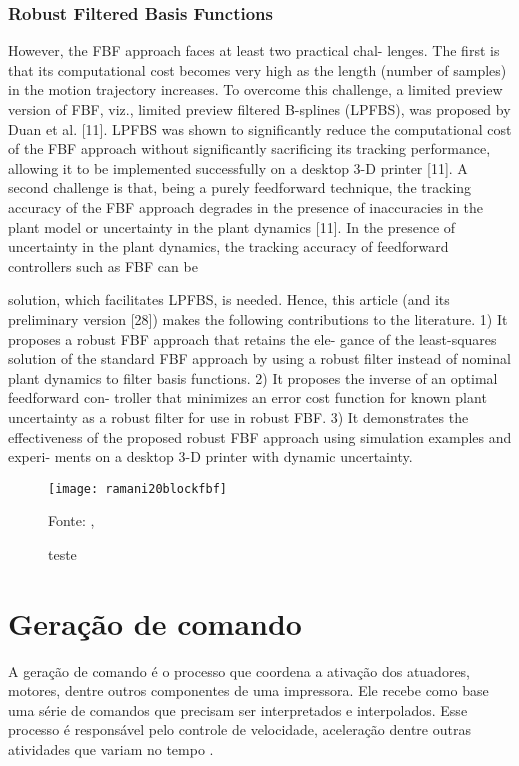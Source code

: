 \subsubsection{Robust Filtered Basis Functions}

However, the FBF approach faces at least two practical chal-
lenges. The first is that its computational cost becomes very
high as the length (number of samples) in the motion trajectory
increases. To overcome this challenge, a limited preview version
of FBF, viz., limited preview filtered B-splines (LPFBS), was
proposed by Duan et al. [11]. LPFBS was shown to significantly
reduce the computational cost of the FBF approach without
significantly sacrificing its tracking performance, allowing it to
be implemented successfully on a desktop 3-D printer [11]. A
second challenge is that, being a purely feedforward technique,
the tracking accuracy of the FBF approach degrades in the
presence of inaccuracies in the plant model or uncertainty in
the plant dynamics [11].
In the presence of uncertainty in the plant dynamics, the
tracking accuracy of feedforward controllers such as FBF can be

solution, which facilitates LPFBS, is needed.
Hence, this article (and its preliminary version [28]) makes
the following contributions to the literature.
1) It proposes a robust FBF approach that retains the ele-
gance of the least-squares solution of the standard FBF
approach by using a robust filter instead of nominal plant
dynamics to filter basis functions.
2) It proposes the inverse of an optimal feedforward con-
troller that minimizes an error cost function for known
plant uncertainty as a robust filter for use in robust FBF.
3) It demonstrates the effectiveness of the proposed robust
FBF approach using simulation examples and experi-
ments on a desktop 3-D printer with dynamic uncertainty.
\cite{ramani20}


\begin{figure}[!htb]
    \centering
    \caption{teste}
    \texttt{[image: ramani20blockfbf]}

    {\footnotesize Fonte: \citeauthor{ramani20}, \citeyear{ramani20}}
    \label{fig:label9}
\end{figure}

\section{Geração de comando}
A geração de comando é o processo que coordena a ativação dos 
atuadores, motores, dentre outros componentes de uma impressora. 
Ele recebe como base uma série de comandos que precisam ser 
interpretados e interpolados. Esse processo é responsável pelo 
controle de velocidade, aceleração dentre outras atividades que 
variam no tempo \cite{yu20}. 

